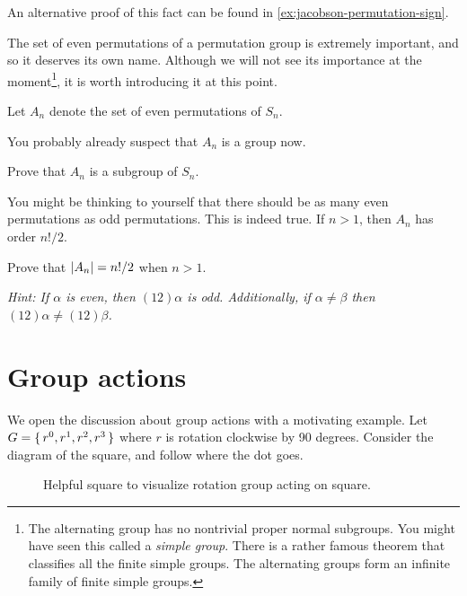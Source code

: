 \documentclass[./main.tex]{subfiles}
\begin{document}
An alternative proof of this fact can be found in \cref{ex:jacobson-permutation-sign}.

The set of even permutations of a permutation group is extremely important, and
so it deserves its own name. Although we will not see its importance at the
moment\footnote{The alternating group has no nontrivial proper normal subgroups.
You might have seen this called a \emph{simple group}. There is a rather famous
theorem that classifies all the finite simple groups. The alternating groups
form an infinite family of finite simple groups.}, it is worth introducing it at
this point.
\begin{definition}
\label{def:alternating-group}
    Let $A_n$ denote the set of even permutations of $S_n$.
\end{definition}
You probably already suspect that $A_n$ is a group now.
\begin{exercise}
    Prove that $A_n$ is a subgroup of $S_n$.
\end{exercise}

You might be thinking to yourself that there should be as many even permutations
as odd permutations. This is indeed true. If $n > 1$, then $A_n$ has order
$n!/2$. 
\begin{exercise}
    Prove that $\abs{A_n} = n!/2$ when $n > 1$. 

    \textit{Hint: If $\alpha$ is even, then $(12)\alpha$ is odd. Additionally, if $\alpha \neq \beta$ then $(12)\alpha \neq (12)\beta$.}
\end{exercise}

\section{Group actions}
We open the discussion about group actions with a motivating example. Let $G =
\set{r^0, r^1, r^2, r^3}$ where $r$ is rotation clockwise by 90 degrees.
Consider the diagram of the square, and follow where the dot goes.
\begin{figure}[h]
    \centering
    \caption{Helpful square to visualize rotation group acting on square.}
\end{figure}
\end{document}
